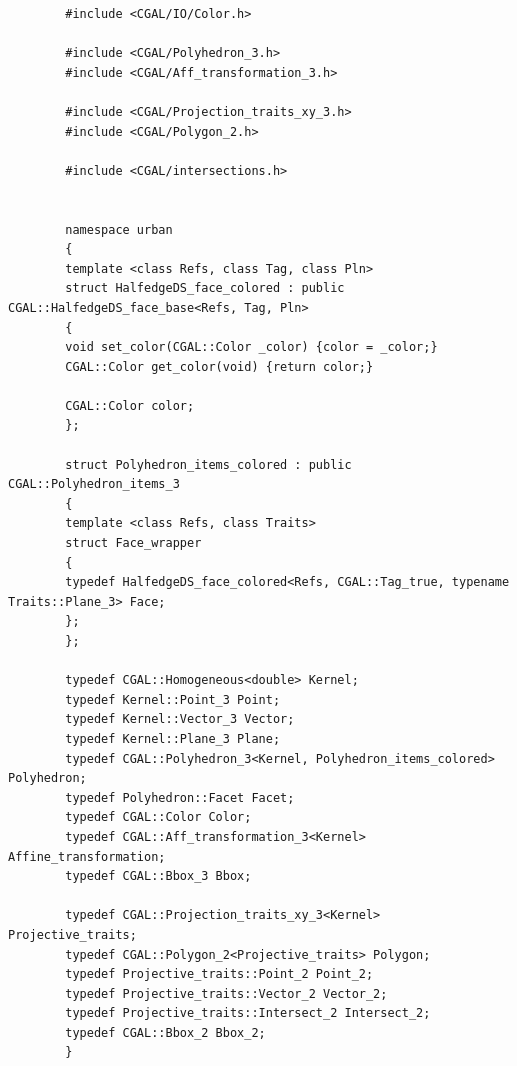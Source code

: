 \documentclass[a4paper, 11pt]{article}
\begin{document}
\begin{itemize}
\begin{lstlisting}
		#include <CGAL/IO/Color.h>
		
		#include <CGAL/Polyhedron_3.h>
		#include <CGAL/Aff_transformation_3.h>
		
		#include <CGAL/Projection_traits_xy_3.h>
		#include <CGAL/Polygon_2.h>
		
		#include <CGAL/intersections.h>
		
		
		namespace urban
		{
		template <class Refs, class Tag, class Pln>
		struct HalfedgeDS_face_colored : public CGAL::HalfedgeDS_face_base<Refs, Tag, Pln> 
		{
		void set_color(CGAL::Color _color) {color = _color;}
		CGAL::Color get_color(void) {return color;}
		
		CGAL::Color color;
		};
		
		struct Polyhedron_items_colored : public CGAL::Polyhedron_items_3
		{
		template <class Refs, class Traits>
		struct Face_wrapper
		{
		typedef HalfedgeDS_face_colored<Refs, CGAL::Tag_true, typename Traits::Plane_3> Face;
		};
		};
		
		typedef CGAL::Homogeneous<double> Kernel;
		typedef Kernel::Point_3 Point;
		typedef Kernel::Vector_3 Vector;
		typedef Kernel::Plane_3 Plane;
		typedef CGAL::Polyhedron_3<Kernel, Polyhedron_items_colored> Polyhedron;
		typedef Polyhedron::Facet Facet;
		typedef CGAL::Color Color;
		typedef CGAL::Aff_transformation_3<Kernel> Affine_transformation;
		typedef CGAL::Bbox_3 Bbox;
		
		typedef CGAL::Projection_traits_xy_3<Kernel> Projective_traits;
		typedef CGAL::Polygon_2<Projective_traits> Polygon;
		typedef Projective_traits::Point_2 Point_2;
		typedef Projective_traits::Vector_2 Vector_2;
		typedef Projective_traits::Intersect_2 Intersect_2;
		typedef CGAL::Bbox_2 Bbox_2;
		}
		
		\end{lstlisting}
		
	\end{itemize}
	
\end{document}
